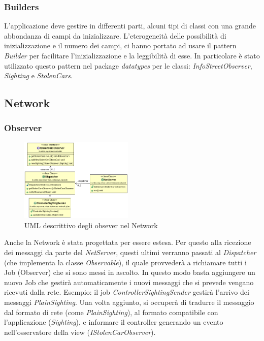 \documentclass[a4paper,12pt]{report}
\begin{document}
    \subsubsection {Builders}
    L'applicazione deve gestire in differenti parti, alcuni tipi di classi con 
una grande abbondanza di campi da inizializzare. L'eterogeneità delle 
possibilità di inizializzazione e il numero dei campi, ci hanno portato ad usare 
il pattern \textit{Builder} per facilitare l'inizializzazione e la leggibilità 
di esse.\newline
    In particolare è stato utilizzato questo pattern nel package 
\textit{datatypes} per le classi: \textit{InfoStreetObserver}, 
\textit{Sighting} e \textit{StolenCars}.
  
  \subsection{Network}
    \subsubsection{Observer}
    \begin{figure}
      \vspace{-40pt}
      \begin{center}
\includegraphics[width=0.48\textwidth]{images/UMLnetworkObserver}
	\caption{UML descrittivo degli obsever nel Network}
	\label{fig:UMLnetworkObserver}
      \end{center}
    \end{figure}
      Anche la Network è stata progettata per essere estesa. Per questo alla 
      ricezione dei messaggi da parte del \textit{NetServer}, questi ultimi 
verranno passati al \textit{Dispatcher} (che implementa la classe 
\textit{Observable}), il quale provvederà a richiamare tutti i Job (Observer) 
che si sono messi in ascolto. In questo modo basta aggiungere un nuovo Job che 
gestirà automaticamente i nuovi messaggi che si prevede vengano ricevuti dalla 
rete. \newline
Esempio: il job \textit{ControllerSightingSender} gestirà l'arrivo dei messaggi 
\textit{PlainSighting}. Una volta aggiunto, si occuperà di tradurre il messaggio 
dal formato di rete (come \textit{PlainSighting}), al formato compatibile con 
l'applicazione (\textit{Sighting}), e informare il controller generando un 
evento nell'osservatore della view (\textit{IStolenCarObserver}).
  
\end{document}
